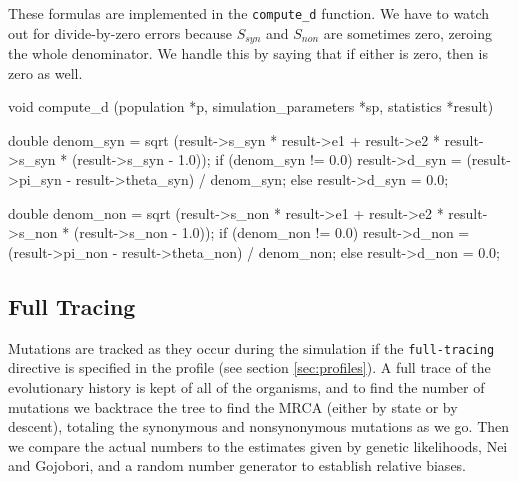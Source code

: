 \documentclass{article}
\begin{document}
      These formulas are implemented in the \verb|compute_d| function. We have
      to watch out for divide-by-zero errors because $S_{syn}$ and $S_{non}$ are
      sometimes zero, zeroing the whole denominator. We handle this by saying
      that if either is zero, then \D{} is zero as well.

\begin{ccode}
void compute_d (population *p, simulation_parameters *sp, statistics *result) {
  double denom_syn = sqrt (result->s_syn * result->e1 + result->e2 * result->s_syn *
							(result->s_syn - 1.0));
  if (denom_syn != 0.0)
    result->d_syn = (result->pi_syn - result->theta_syn) / denom_syn;
  else
    result->d_syn = 0.0;

  double denom_non = sqrt (result->s_non * result->e1 + result->e2 * result->s_non *
							(result->s_non - 1.0));
  if (denom_non != 0.0)
    result->d_non = (result->pi_non - result->theta_non) / denom_non;
  else
    result->d_non = 0.0;
}
\end{ccode}

    \subsection{Full Tracing}
      \label{sec:full-tracing}

      Mutations are tracked as they occur during the simulation if the
      \verb|full-tracing| directive is specified in the profile (see section
	  \ref{sec:profiles}). A full trace of the evolutionary history is
      kept of all of the organisms, and to find the number of mutations we
      backtrace the tree to find the MRCA (either by state or by descent),
      totaling the synonymous and nonsynonymous mutations as we go. Then we
      compare the actual numbers to the estimates given by genetic likelihoods,
      Nei and Gojobori, and a random number generator to establish relative
      biases.
\end{document}
